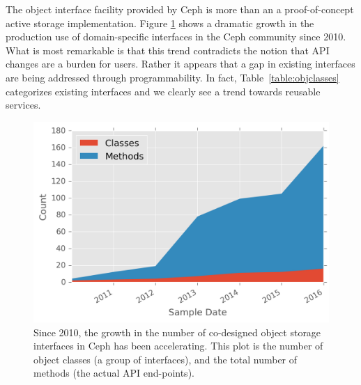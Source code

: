 \documentclass[10pt,twocolumn]{article}
\begin{document}
The object interface facility provided by Ceph is more than an
a proof-of-concept active storage implementation.  Figure
\ref{fig:obj-int-dev-growth} shows a dramatic growth in the production use of
domain-specific interfaces in the Ceph community since 2010.  What is most
remarkable is that this trend contradicts the notion that API changes are a
burden for users.
Rather it appears that a gap in existing interfaces are
being addressed through programmability. In fact, Table~\ref{table:objclasses}
categorizes existing interfaces and we clearly see a trend towards reusable
services.

\begin{figure}[ht]
\centering
\includegraphics{figures/obj-int-dev-growth.png}
\caption{Since 2010, the growth in the number of co-designed object
storage interfaces in Ceph has been accelerating. This plot is the
number of object classes (a group of interfaces), and the total number
of methods (the actual API end-points).\label{fig:obj-int-dev-growth}}
\end{figure}
\end{document}

